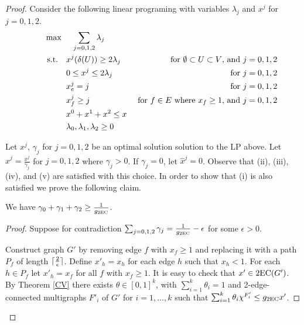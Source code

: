 \documentclass[runningheads]{llncs}
\begin{document}
\begin{proof}
	Consider the following linear programing with variables $\lambda_j$ and $x^j$ for $j=0,1,2$. 
	\begin{align}
		\quad\quad& \max\quad \;\sum_{j=0,1,2}\lambda_j\\
		&\;\text{s.t.} \quad x^j(\delta(U))\geq 2\lambda_j \;& \mbox{ for $\emptyset \subset U \subset V$, and $j=0,1,2$} \label{feasibility2ec}\\
		&\;{\color{white}{\text{s.t.}} }\quad 0 \leq x^j \leq 2\lambda_j\; &\mbox{ for $j=0,1,2$}\label{bound2ec}\\
		&\;{\color{white}{\text{s.t.}} }\quad x^j_e = j\; &\mbox{ for $j=0,1,2$}\label{branchcoordinate2ec}\\
		&\;{\color{white}{\text{s.t.}} }\quad x^j_f \geq j \; &\mbox{ for $f\in E$ where $x_f \geq 1$, and $j=0,1,2$}\label{1edges2ec}\\
		&\;{\color{white}{\text{s.t.}} }\quad x^0 + x^1+x^2 \leq x\label{packing2ec}\\
		&\;{\color{white}{\text{s.t.}} }\quad \lambda_0,\lambda_1,\lambda_2 \geq 0
	\end{align}
	
	Let $x^j$, $\gamma_j$ for $j=0,1,2$ be an optimal solution solution to the LP above. Let $\hat{x}^{j}=\frac{x^j}{\gamma_j}$ for $j=0,1,2$ where $\gamma_j>0$. If $\gamma_j=0$, let $\hat{x}^{j}=0$. Observe that  (ii), (iii), (iv), and (v) are satisfied with this choice. In order to show that (i) is also satisfied we prove the following claim.
	
	
	
	\begin{claim}\label{CVexists}
		We have $\gamma_0 + \gamma_1+\gamma_2\geq \frac{1}{g_{\operatorname{2EC}}}$.
	\end{claim}
	\begin{proof}
		Suppose for contradiction $\sum_{j=0,1,2}\gamma_j = \frac{1}{g_{\operatorname{2EC}}} - \epsilon$ for some $\epsilon >0$. 
		
		Construct graph $G'$ by removing edge $f$ with $x_f\geq 1$ and replacing it with a path $P_f$ of length $\lceil\frac{2}{\epsilon}\rceil$. Define $x'_h = x_h$ for each edge $h$ such that $x_h<1$. For each $h\in P_f$ let $x'_h= x_f$ for all $f$ with $x_f\geq 1$. It is easy to check that $x'\in \operatorname{2EC}(G')$. By Theorem \ref{CV} there exists $\theta \in [0,1]^k$, with $\sum_{i=1}^{k}\theta_i = 1$ and 2-edge-connected multigraphs $F'_i$ of $G'$ for $i=1,\ldots,k$ such that 
		$\sum_{i=1}^{k}\theta_i \chi^{F'_i}\leq g_{\operatorname{2EC}}x'$. 
		

\end{proof}
\end{proof}
\end{document}
